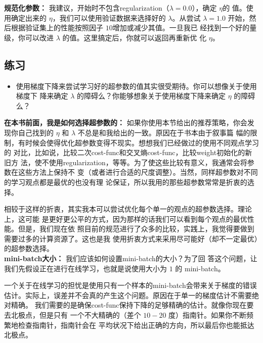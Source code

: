 \textbf{规范化参数：} 我建议，开始时不包含\gls*{regularization}（$\lambda=0.0$），确定 $\eta$的
值。使用确定出来的 $\eta$，我们可以使用验证数据来选择好的 $\lambda$。从尝试
$\lambda=1.0$ 开始，然后根据验证集上的性能按照因子 $10$增加或减少其值。一旦我已
经找到一个好的量级，你可以改进 $\lambda$ 的值。这里搞定后，你就可以返回再重新优
化 $\eta$。

\subsection*{练习}

\begin{itemize}
\item 使用梯度下降来尝试学习好的超参数的值其实很受期待。你可以想像关于使用梯度下
  降来确定 $\lambda$ 的障碍么？你能够想象关于使用梯度下降来确定 $\eta$ 的障碍么？
\end{itemize}

\textbf{在本书前面，我是如何选择超参数的：} 如果你使用本节给出的推荐策略，你会发
现你自己找到的 $\eta$ 和 $\lambda$ 不总是和我给出的一致。原因在于书本由于叙事篇
幅的限制，有时候会使得优化超参数变得不现实。想想我们已经做过的使用不同观点学习的
对比，比如说，比较二次\gls*{cost-func}和交叉熵\gls*{cost-func}，比较\gls*{weight}初始化的新旧方
法，使不使用\gls*{regularization}，等等。为了使这些比较有意义，我通常会将参数在这些方法上保持不
变（或者进行合适的尺度调整）。当然，同样超参数对不同的学习观点都是最优的也没有理
论保证，所以我用的那些超参数常常是折衷的选择。

相较于这样的折衷，其实我本可以尝试优化每个单一的观点的超参数选择。理论上，这可能
是更好更公平的方式，因为那样的话我们可以看到每个观点的最优性能。但是，我们现在依
照目前的规范进行了众多的比较，实践上，我觉得要做到需要过多的计算资源了。这也是我
使用折衷方式来采用尽可能好（却不一定最优）的超参数选择。\\

\label{mini_batch_size}
\textbf{\gls*{mini-batch}大小：} 我们应该如何设置\gls*{mini-batch}的大小？为了回
答这个问题，让我们先假设正在进行在线学习，也就是说使用大小为 $1$ 的%
\gls*{mini-batch}。

一个关于在线学习的担忧是使用只有一个样本的\gls*{mini-batch}会带来关于梯度的错误
估计。实际上，误差并不会真的产生这个问题。原因在于单一的梯度估计不需要绝对精确。
我们需要的是确保\gls*{cost-func}保持下降的足够精确的估计。就像你现在要去北极点，但是只有
一个不大精确的（差个 $10-20$ 度）指南针。如果你不断频繁地检查指南针，指南针会在
平均状况下给出正确的方向，所以最后你也能抵达北极点。

